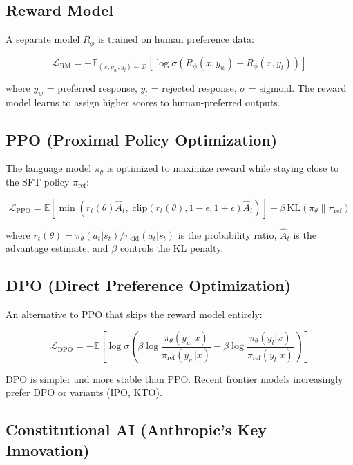 \documentclass[11pt,a4paper]{article}
\begin{document}
\subsection{Reward Model}

A separate model $R_\phi$ is trained on human preference data:

$$\mathcal{L}_{\text{RM}} = -\mathbb{E}_{(x, y_w, y_l) \sim \mathcal{D}} \left[\log \sigma\!\left(R_\phi(x, y_w) - R_\phi(x, y_l)\right)\right]$$

where $y_w$ = preferred response, $y_l$ = rejected response, $\sigma$ = sigmoid. The reward model learns to assign higher scores to human-preferred outputs.

\subsection{PPO (Proximal Policy Optimization)}

The language model $\pi_\theta$ is optimized to maximize reward while staying close to the SFT policy $\pi_{\text{ref}}$:

$$\mathcal{L}_{\text{PPO}} = \mathbb{E}\!\left[\min\!\left(r_t(\theta)\hat{A}_t,\; \text{clip}(r_t(\theta), 1{-}\epsilon, 1{+}\epsilon)\hat{A}_t\right)\right] - \beta\, \text{KL}\!\left(\pi_\theta \| \pi_{\text{ref}}\right)$$

where $r_t(\theta) = \pi_\theta(a_t|s_t) / \pi_{\text{old}}(a_t|s_t)$ is the probability ratio, $\hat{A}_t$ is the advantage estimate, and $\beta$ controls the KL penalty.

\subsection{DPO (Direct Preference Optimization)}

An alternative to PPO that skips the reward model entirely:

$$\mathcal{L}_{\text{DPO}} = -\mathbb{E}\!\left[\log \sigma\!\left(\beta \log \frac{\pi_\theta(y_w|x)}{\pi_{\text{ref}}(y_w|x)} - \beta \log \frac{\pi_\theta(y_l|x)}{\pi_{\text{ref}}(y_l|x)}\right)\right]$$

DPO is simpler and more stable than PPO. Recent frontier models increasingly prefer DPO or variants (IPO, KTO).

\subsection{Constitutional AI (Anthropic's Key Innovation)}
\end{document}
